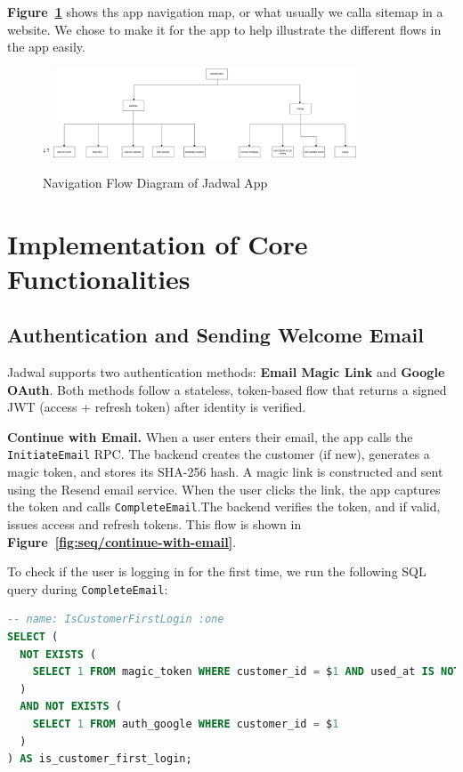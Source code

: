 \textbf{Figure~\ref{fig:sitemap}} shows ths app navigation map, or what usually we calla  sitemap in a website. We chose to make it for the app to help illustrate the different flows in the app easily.

\begin{figure}[H]`'
    \centering
    \includegraphics[width=0.8\textwidth]{images/JadwalSitemap.drawio.png}
    \caption{Navigation Flow Diagram of Jadwal App}
    \label{fig:sitemap}
\end{figure}

\section{Implementation of Core Functionalities}

\subsection{Authentication and Sending Welcome Email} \label{subsec:authentication}

Jadwal supports two authentication methods: \textbf{Email Magic Link} and \textbf{Google OAuth}. Both methods follow a stateless, token-based flow that returns a signed JWT (access + refresh token) after identity is verified.

\textbf{Continue with Email.} When a user enters their email, the app calls the \texttt{InitiateEmail} RPC.
The backend creates the customer (if new), generates a magic token, and stores its SHA-256 hash.
A magic link is constructed and sent using the Resend email service. When the user clicks the link, the app captures the token and calls \texttt{CompleteEmail}.The backend verifies the token, and if valid, issues access and refresh tokens. This flow is shown in \textbf{Figure~\ref{fig:seq/continue-with-email}}.

To check if the user is logging in for the first time, we run the following SQL query during \texttt{CompleteEmail}:

\begin{lstlisting}[language=SQL, caption={Check for First Login}, label={lst:is-first-login}]
-- name: IsCustomerFirstLogin :one
SELECT (
  NOT EXISTS (
    SELECT 1 FROM magic_token WHERE customer_id = $1 AND used_at IS NOT NULL
  )
  AND NOT EXISTS (
    SELECT 1 FROM auth_google WHERE customer_id = $1
  )
) AS is_customer_first_login;
\end{lstlisting}

